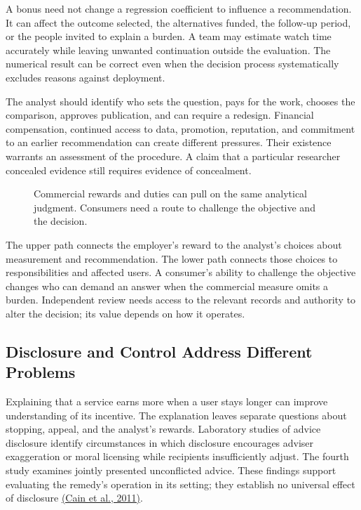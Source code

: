 \noindent \noindent A bonus need not change a regression coefficient to influence
a recommendation. It can affect the outcome selected, the alternatives
funded, the follow-up period, or the people invited to explain a burden.
A team may estimate watch time accurately while leaving unwanted
continuation outside the evaluation. The numerical result can be correct
even when the decision process systematically excludes reasons against
deployment.

The analyst should identify who sets the question, pays for the work,
chooses the comparison, approves publication, and can require a
redesign. Financial compensation, continued access to data, promotion,
reputation, and commitment to an earlier recommendation can create
different pressures. Their existence warrants an assessment of the
procedure. A claim that a particular researcher concealed evidence still
requires evidence of concealment.

\begin{figure}[htbp]
\centering

\caption{Commercial rewards and duties can pull on the same analytical judgment. Consumers need a route to challenge the objective and the decision.}\label{fig:M09_conflict_judgment}
\end{figure}

The upper path connects the employer's reward to the analyst's choices
about measurement and recommendation. The lower path connects those
choices to responsibilities and affected users. A consumer's ability to
challenge the objective changes who can demand an answer when the
commercial measure omits a burden. Independent review needs access to
the relevant records and authority to alter the decision; its value
depends on how it operates.

\hypertarget{M09-disclosure-and-control-address-different-problems}{%
\subsection{Disclosure and Control Address Different
Problems}\label{M09-disclosure-and-control-address-different-problems}}

\noindent \noindent Explaining that a service earns more when a user stays longer
can improve understanding of its incentive. The explanation leaves
separate questions about stopping, appeal, and the analyst's rewards.
Laboratory studies of advice disclosure identify circumstances in which
disclosure encourages adviser exaggeration or moral licensing while
recipients insufficiently adjust. The fourth study examines jointly
presented unconflicted advice. These findings support evaluating the
remedy's operation in its setting; they establish no universal effect of
disclosure
\href{https://www.cmu.edu/dietrich/sds/docs/loewenstein/WhenSunLightFails.pdf}{(Cain
et al., 2011)}.

